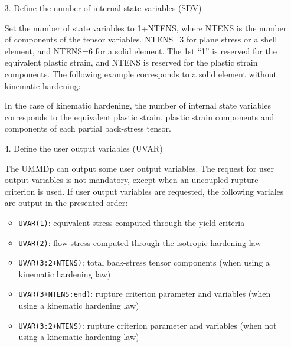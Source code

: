 \documentclass[11pt,a4paper,twoside,final,onecolumn,titlepage]{article}
\begin{document}
\begin{enumerate}
	\item[3.] Define the number of internal state variables (SDV)
	\item[] Set the number of state variables to 1+NTENS, where NTENS is the number of components of the tensor variables. NTENS=3 for plane stress or a shell element, and NTENS=6 for a solid element. The 1st “1” is reserved for the equivalent plastic strain, and NTENS is reserved for the plastic strain components. The following example corresponds to a solid element without kinematic hardening:\\
	\par
	\texttt{}
	\par\bigskip
	\item[] In the case of kinematic hardening, the number of internal state variables corresponds to the equivalent plastic strain, plastic strain components and components of each partial back-stress tensor. 
	\par\bigskip
\end{enumerate}

\begin{enumerate}
	\item[4.] Define the user output variables (UVAR)
	\item[] The UMMDp can output some user output variables. The request for user output variables is not mandatory, except when an uncoupled rupture criterion is used. If user output variables are requested, the following variales are output in the presented order:
	\begin{itemize}
		\item \texttt{UVAR(1)}: equivalent stress computed through the yield criteria
		\item \texttt{UVAR(2)}: flow stress computed through the isotropic hardening law
		\item \texttt{UVAR(3:2+NTENS)}: total back-stress tensor components (when using a kinematic hardening law)
		\item \texttt{UVAR(3+NTENS:end)}: rupture criterion parameter and variables (when using a kinematic hardening law)
		\item \texttt{UVAR(3:2+NTENS)}: rupture criterion parameter and variables (when not using a kinematic hardening law)
	\end{itemize}
	\par\bigskip
	\texttt{}
	\par\bigskip
\end{enumerate}
\end{document}
